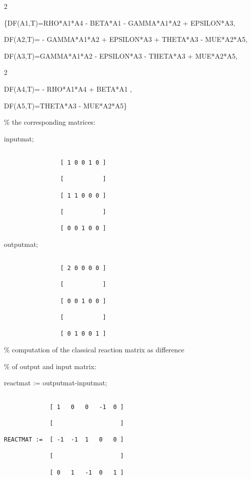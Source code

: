 \documentclass[a4paper]{article}
\begin{document}
 2

\{DF(A1,T)=RHO{*}A1{*}A4 - BETA{*}A1 - GAMMA{*}A1{*}A2 + EPSILON{*}A3,



DF(A2,T)= - GAMMA{*}A1{*}A2 + EPSILON{*}A3 + THETA{*}A3 - MUE{*}A2{*}A5,



DF(A3,T)=GAMMA{*}A1{*}A2 - EPSILON{*}A3 - THETA{*}A3 + MUE{*}A2{*}A5,


 2

DF(A4,T)= - RHO{*}A1{*}A4 + BETA{*}A1 ,


DF(A5,T)=THETA{*}A3 - MUE{*}A2{*}A5\}


\% the corresponding matrices:


 inputmat;

\begin{verbatim}

                [ 1 0 0 1 0 ]

                [           ]

                [ 1 1 0 0 0 ]

                [           ]

                [ 0 0 1 0 0 ]

\end{verbatim}

 outputmat;

\begin{verbatim}

                [ 2 0 0 0 0 ]

                [           ] 

                [ 0 0 1 0 0 ] 

                [           ] 

                [ 0 1 0 0 1 ] 

\end{verbatim}


\% computation of the classical reaction matrix as difference

\% of output and input matrix:


 reactmat := outputmat-inputmat;

\begin{verbatim}

             [ 1   0   0   -1  0 ]

             [                   ] 

REACTMAT :=  [ -1  -1  1   0   0 ] 

             [                   ] 

             [ 0   1   -1  0   1 ]

\end{verbatim}
\end{document}
